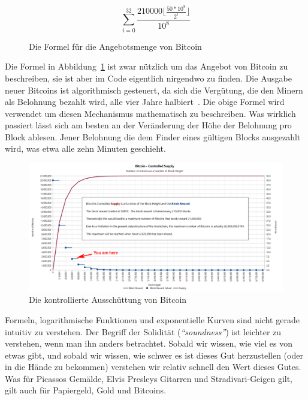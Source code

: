 \begin{figure}
  \centering
  \begin{equation}
  \sum\limits_{i=0}^{32} \frac{210000 \lfloor \frac{50*10^8}{2^i} \rfloor}{10^8}
  \end{equation}
  \caption{Die Formel für die Angebotsmenge von Bitcoin}
  \label{fig:supply-formula-white}
\end{figure}

Die Formel in Abbildung~\ref{fig:supply-formula-white} ist zwar nützlich um das
Angebot von Bitcoin zu beschreiben, sie ist aber im Code eigentlich nirgendwo zu
finden. Die Ausgabe neuer Bitcoins ist algorithmisch gesteuert, da sich die
Vergütung, die den Minern als Belohnung bezahlt wird, alle vier Jahre
halbiert~\cite{btcwiki:supply}. Die obige Formel wird verwendet um diesen
Mechanismus mathematisch zu beschreiben. Was wirklich passiert lässt sich am
besten an der Veränderung der Höhe der Belohnung pro Block ablesen. Jener
Belohnung die dem Finder eines gültigen Blocks ausgezahlt wird, was etwa alle zehn
Minuten geschieht.

\begin{figure}
  \includegraphics{assets/images/you-are-here.png}
  \caption{Die kontrollierte Ausschüttung von Bitcoin}
  \label{fig:you-are-here.png}
\end{figure}

Formeln, logarithmische Funktionen und exponentielle Kurven sind nicht gerade
intuitiv zu verstehen. Der Begriff der Solidität (\textit{\enquote{soundness}})
ist leichter zu verstehen, wenn man ihn anders betrachtet. Sobald wir wissen, wie
viel es von etwas gibt, und sobald wir wissen, wie schwer es ist dieses Gut
herzustellen (oder in die Hände zu bekommen) verstehen wir relativ schnell den
Wert dieses Gutes. Was für Picassos Gemälde, Elvis Presleys Gitarren und
Stradivari-Geigen gilt, gilt auch für Papiergeld, Gold und Bitcoins.

